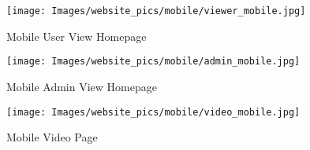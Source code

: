 \documentclass[onecolumn, draftclsnofoot,10pt, compsoc]{IEEEtran}
\begin{document}
    \begin{figure}[h!]
        \centering
        \texttt{[image: Images/website\_pics/mobile/viewer\_mobile.jpg]}
        \centering\caption{Mobile User View Homepage}
        \label{fig:MUser}
    \end{figure}
    
    \begin{figure}[h!]
        \centering
        \texttt{[image: Images/website\_pics/mobile/admin\_mobile.jpg]}
        \centering\caption{Mobile Admin View Homepage}
        \label{fig:MAdmin}
    \end{figure}

    \begin{figure}[h!]
        \centering
        \texttt{[image: Images/website\_pics/mobile/video\_mobile.jpg]}
        \centering\caption{Mobile Video Page}
        \label{fig:MVideo}
    \end{figure}
\end{document}

